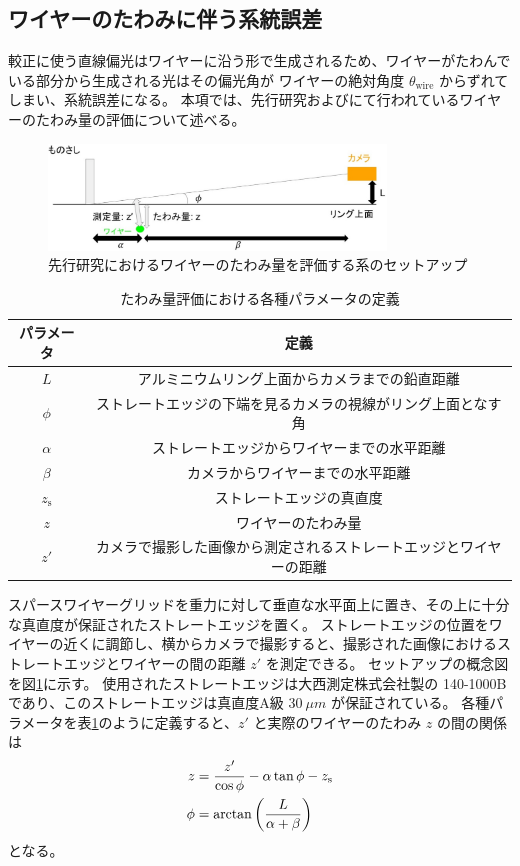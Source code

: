 \documentclass[../../main.tex]{subfiles}
\begin{document}
\subsection{ワイヤーのたわみに伴う系統誤差}
較正に使う直線偏光はワイヤーに沿う形で生成されるため、ワイヤーがたわんでいる部分から生成される光はその偏光角が
ワイヤーの絶対角度 $\theta_{\mathrm{wire}}$ からずれてしまい、系統誤差になる。
本項では、先行研究\cite{swg:murata}および\cite{swg:iijima}にて行われているワイヤーのたわみ量の評価について述べる。
\begin{figure}[H]
    \centering
    \includegraphics[width=0.8\textwidth]{wiregrid/wiresag_setup_old.pdf}
    \caption{先行研究におけるワイヤーのたわみ量を評価する系のセットアップ\cite{swg:murata}}
    \label{fig:wiresag_setup_old}
\end{figure}
\begin{table}[H]
    \centering
    \caption{たわみ量評価における各種パラメータの定義}
    \begin{tabular}{|c|c|}
        \hline
        パラメータ & 定義 \\
        \hline
        $L$ & アルミニウムリング上面からカメラまでの鉛直距離 \\
        $\phi$ & ストレートエッジの下端を見るカメラの視線がリング上面となす角 \\
        $\alpha$ & ストレートエッジからワイヤーまでの水平距離 \\
        $\beta$ & カメラからワイヤーまでの水平距離 \\
        $z_{\mathrm{s}}$ & ストレートエッジの真直度 \\
        $z$ & ワイヤーのたわみ量 \\
        $z'$ & カメラで撮影した画像から測定されるストレートエッジとワイヤーの距離 \\
        \hline
    \end{tabular}
    \label{tab:wiresag_setup_old}
\end{table}
スパースワイヤーグリッドを重力に対して垂直な水平面上に置き、その上に十分な真直度が保証されたストレートエッジを置く。
ストレートエッジの位置をワイヤーの近くに調節し、横からカメラで撮影すると、撮影された画像におけるストレートエッジとワイヤーの間の距離 $z'$ を測定できる。
セットアップの概念図を図\ref{fig:wiresag_setup_old}に示す。
使用されたストレートエッジは大西測定株式会社製の 140-1000B であり、このストレートエッジは真直度A級 $\SI{30}{\mu m}$ が保証されている。
各種パラメータを表\ref{tab:wiresag_setup_old}のように定義すると、$z'$ と実際のワイヤーのたわみ $z$ の間の関係は
\begin{align}
    z &= \dfrac{z'}{\cos\phi} - \alpha\tan\phi - z_{\mathrm{s}} \\
    \phi &= \arctan\qty(\dfrac{L}{\alpha+\beta})
\end{align}
となる。
\end{document}
